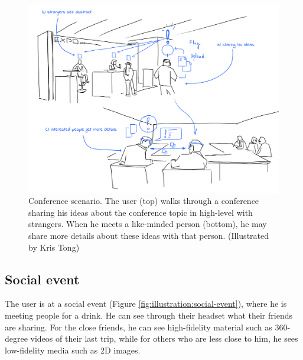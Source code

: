 \begin{figure}
    \centering
    \includegraphics[width=0.8\linewidth]{images/30-continuum/illustrations/4_Flag_On_Conference.png}
    \caption{Conference scenario. The user (top) walks through a conference sharing his ideas about the conference topic in high-level with strangers. When he meets a like-minded person (bottom), he may share more details about these ideas with that person. (Illustrated by Kris Tong)}
    \label{fig:illustration:conference}
\end{figure}

\subsection{Social event}

The user is at a social event (Figure \ref{fig:illustration:social-event}), where he is meeting people for a drink. He can see through their headset what their friends are sharing. For the close friends, he can see high-fidelity material such as 360-degree videos of their last trip, while for others who are less close to him, he sees low-fidelity media such as 2D images. 

